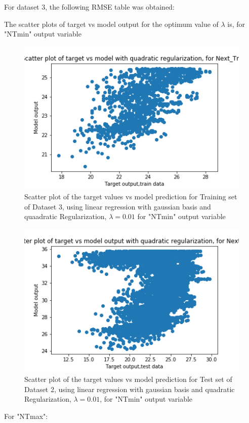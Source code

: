 \documentclass[12pt,a4paper]{article}
\begin{document}
For dataset 3, the following RMSE table was obtained:

The scatter plots of target vs model output for the optimum value of $\lambda$ is, for "NTmin" output variable
\begin{figure}[H]
     \centering
     \includegraphics[scale=0.5]{images/scatter_ds3quadtrainT_min.png}
     \caption{Scatter plot of the target values vs model prediction for Training set of Dataset 3, using linear regression with gaussian basis and quaadratic Regularization, $\lambda = 0.01 $ for "NTmin" output variable}
     \label{fig:tikhds2tr}
\end{figure}
\begin{figure}[H]
     \centering
     \includegraphics[scale=0.5]{images/scatter_ds3quadtestT_min.png}
     \caption{Scatter plot of the target values vs model prediction for Test set of Dataset 2, using linear regression with gaussian basis and quadratic Regularization, $\lambda = 0.01 $, for "NTmin" output variable}
     \label{fig:tikhds2tr}
\end{figure}
For "NTmax":
\end{document}
